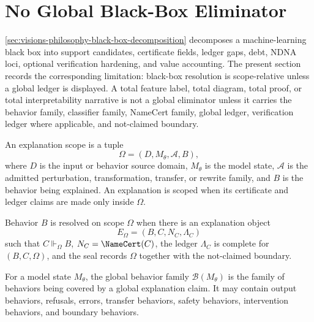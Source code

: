 \section{No Global Black-Box Eliminator}
\label{sec:visions-philosophy-scoped-certification-principle}

\autoref{sec:visions-philosophy-black-box-decomposition} decomposes a
machine-learning black box into support candidates, certificate fields,
ledger gaps, debt, NDNA loci, optional verification hardening, and value
accounting. The present section records the corresponding limitation:
black-box resolution is scope-relative unless a global ledger is
displayed. A total feature label, total diagram, total proof, or total
interpretability narrative is not a global eliminator unless it carries
the behavior family, classifier family, NameCert family, global ledger,
verification ledger where applicable, and not-claimed boundary.

\begin{definition}
\label{def:philosophy-scoped-certification-explanation-scope}
An explanation scope is a tuple
$$
\Omega=(D,M_\theta,\mathcal A,B),
$$
where $D$ is the input or behavior source domain, $M_\theta$ is the
model state, $\mathcal A$ is the admitted perturbation, transformation,
transfer, or rewrite family, and $B$ is the behavior being explained. An
explanation is scoped when its certificate and ledger claims are made
only inside $\Omega$.
\end{definition}

\begin{definition}
\label{def:philosophy-scoped-black-box-resolution-principle}
Behavior $B$ is resolved on scope $\Omega$ when there is an explanation
object
$$
E_\Omega=(B,C,N_C,\Lambda_C)
$$
such that $C\Vdash_\Omega B$, $N_C=\NameCert(C)$, the ledger
$\Lambda_C$ is complete for $(B,C,\Omega)$, and the seal records
$\Omega$ together with the not-claimed boundary.
\end{definition}

\begin{definition}
\label{def:philosophy-global-behavior-family}
For a model state $M_\theta$, the global behavior family
$\mathcal B(M_\theta)$ is the family of behaviors being covered by a
global explanation claim. It may contain output behaviors, refusals,
errors, transfer behaviors, safety behaviors, intervention behaviors,
and boundary behaviors.
\end{definition}

